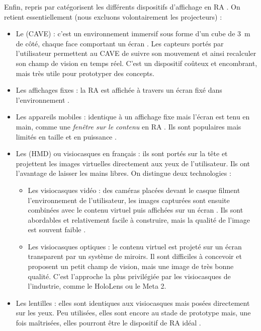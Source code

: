Enfin, \cite{Buxton1998} repris par \cite{Bimber2005} catégorisent les différents dispositifs d'affichage en RA . On retient essentiellement (nous excluons volontairement les projecteurs) :
\begin{itemize}
  \item Le  (CAVE) : c'est un environnement immersif sous forme d'un cube de \SI{3}{\m} de côté, chaque face comportant un écran . Les capteurs portés par l'utilisateur permettent au CAVE de suivre son mouvement et ainsi recalculer son champ de vision en temps réel. C'est un dispositif coûteux et encombrant, mais très utile pour prototyper des concepts.
  \item Les affichages fixes : la RA est affichée à travers un écran fixé dans l'environnement .
  \item Les appareils mobiles : identique à un affichage fixe mais l'écran est tenu en main, comme une \emph{fenêtre sur le contenu} en RA . Ils sont populaires mais limités en taille et en puissance \citep{Huang2013}.
  \item Les  (HMD) ou visiocasques en français : ils sont portés sur la tête et projettent les images virtuelles directement aux yeux de l'utilisateur. Ils ont l'avantage de laisser les mains libres. On distingue deux technologies :
  \begin{itemize}
    \item Les visiocasques vidéo : des caméras placées devant le casque filment l'environnement de l'utilisateur, les images capturées sont ensuite combinées avec le contenu virtuel puis affichées sur un écran . Ils sont abordables et relativement facile à construire, mais la qualité de l'image est souvent faible \citep{Steptoe2013, Piumsomboon2014}.
    \item Les visiocasques optiques : le contenu virtuel est projeté sur un écran transparent par un système de miroirs. Il sont difficiles à concevoir et proposent un petit champ de vision, mais une image de très bonne qualité. C'est l'approche la plus privilégiée par les visiocasques de l'industrie, comme le HoloLens ou le Meta 2.
  \end{itemize}
  \item Les lentilles : elles sont identiques aux visiocasques mais posées directement sur les yeux. Peu utilisées, elles sont encore au stade de prototype mais, une fois maîtrisées, elles pourront être le dispositif de RA idéal \citep{VanKrevelen2010}.
\end{itemize}
\medskip


